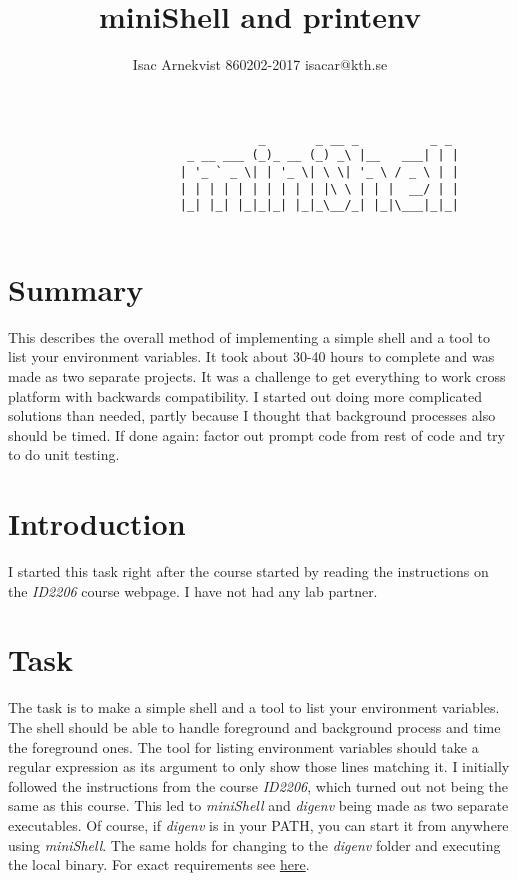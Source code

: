 \documentclass{article}
\author{Isac Arnekvist 860202-2017 isacar@kth.se}
\title{miniShell and printenv}
\begin{document}
\maketitle
\begin{verbatim}
                                   _       _ __ _          _ _ 
                         _ __ ___ (_)_ __ (_) _\ |__   ___| | |
                        | '_ ` _ \| | '_ \| \ \| '_ \ / _ \ | |
                        | | | | | | | | | | |\ \ | | |  __/ | |
                        |_| |_| |_|_|_| |_|_\__/_| |_|\___|_|_|
                                                               
\end{verbatim}
\section*{Summary}
    This describes the overall method of implementing a simple shell and a tool
    to list your environment variables. It took about 30-40 hours to complete
    and was made as two separate projects. It was a challenge to get everything
    to work cross platform with backwards compatibility. I started out doing more
    complicated solutions than needed, partly because I thought that background
    processes also should be timed. If done again: factor
    out prompt code from rest of code and try to do unit testing.

\newpage
{}
\section{Introduction}
    I started this task right after the course started by reading the instructions
    on the \emph{ID2206} course webpage. I have not had any lab partner.
    
\section{Task}
    The task is to make a simple shell and a tool to list your environment
    variables. The shell should be able to handle foreground and background
    process and time the foreground ones. The tool for listing environment
    variables should take a regular expression as its argument to only show
    those lines matching it.  I initially followed the instructions from the
    course \emph{ID2206}, which turned out not being the same as this course.
    This led to \emph{miniShell} and \emph{digenv} being made as two separate
    executables. Of course, if \emph{digenv} is in your PATH, you can start it
    from anywhere using \emph{miniShell}. The same holds for changing to the
    \emph{digenv} folder and executing the local binary. For exact requirements
    see
    \href{https://www.kth.se/social/course/ID2200/page/laborations-pm/}{here}.
\end{document}
